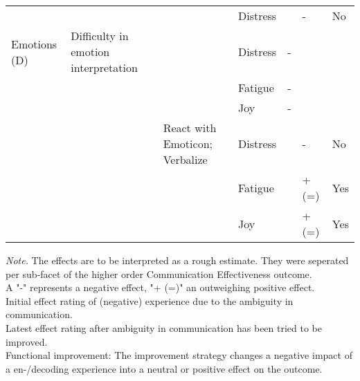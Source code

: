 \documentclass[man]{apa7}
\begin{document}
\begin{landscape}
\begin{table}
\begin{tabular}{lllllll}
                                   &                                                 &                                  & Distress            &             & -           & No                              \\
Emotions (D)                       & Difficulty in emotion interpretation &                                  & Distress            & -           &             &                                 \\
                                   &                                                 &                                  & Fatigue             & -           &             &                                 \\
                                   &                                                 &                                  & Joy                 & -           &             &                                 \\
                                   &                                                 & React with Emoticon; Verbalize   & Distress            &             & -           & No                              \\
                                   &                                                 &                                  & Fatigue             &             & + (=)       & Yes                             \\
                                   &                                                 &                                  & Joy                 &             & + (=)       & Yes                            \\ \bottomrule
\end{tabular}
  \begin{tablenotes}
        {\tiny
        \textit{Note.} The effects are to be interpreted as a rough estimate. They were seperated per sub-facet of the higher order Communication Effectiveness outcome.  \\
        A "-" represents a negative effect, "+ (=)" an outweighing positive effect. \\ 
         Initial effect rating of (negative) experience due to the ambiguity in communication. \\
         Latest effect rating after ambiguity in communication has been tried to be improved. \\
        Functional improvement: The improvement strategy changes a negative impact of a en-/decoding experience into a neutral or positive effect on the outcome.
         }
    \end{tablenotes}
\end{table}


\end{landscape}
\end{document}
